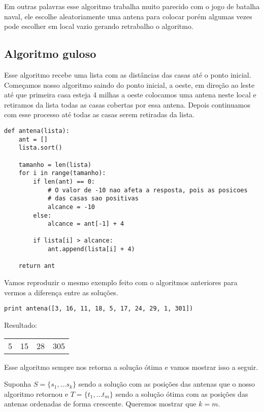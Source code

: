 \documentclass[11pt]{article}
\begin{document}
Em outras palavras esse algoritmo trabalha muito parecido com o jogo
de batalha naval, ele escolhe aleatoriamente uma antena para colocar
porém algumas vezes pode escolher em local vazio gerando retrabalho o
algoritmo.

\subsection{Algoritmo guloso}
\label{sec-3-3}
\label{sec-3-3}

Esse algoritmo recebe uma lista com as distâncias das casas até o
ponto inicial. Começamos nosso algoritmo saindo do ponto inicial,
a oeste, em direção ao leste até que primeira casa esteja 4 milhas a
oeste colocamos uma antena neste local e retiramos da lista todas as
casas cobertas por essa antena. Depois continuamos com esse processo
até todas as casas serem retiradas da lista.

\begin{verbatim}
def antena(lista):
    ant = []
    lista.sort()

    tamanho = len(lista)
    for i in range(tamanho):
        if len(ant) == 0:
            # O valor de -10 nao afeta a resposta, pois as posicoes
            # das casas sao positivas
            alcance = -10
        else:
            alcance = ant[-1] + 4

        if lista[i] > alcance:
            ant.append(lista[i] + 4)

    return ant
\end{verbatim}

Vamos reproduzir o mesmo exemplo feito com o algoritmos anteriores
para vermos a diferença entre as soluções.

\begin{verbatim}
print antena([3, 16, 11, 18, 5, 17, 24, 29, 1, 301])
\end{verbatim}

Resultado:
\begin{center}
\begin{tabular}{rrrr}
5 & 15 & 28 & 305\\
\end{tabular}
\end{center}

Esse algoritmo sempre nos retorna a solução ótima e vamos mostrar isso
a seguir.

Suponha $S = \{ s_1, \ldots s_k \}$ sendo a solução com as posições
das antenas que o nosso algoritmo retornou e $T = \{ t_1, \ldots t_m
\}$ sendo a solução ótima com as posições das antenas ordenadas de
forma crescente. Queremos mostrar que $k=m$.
\end{document}
